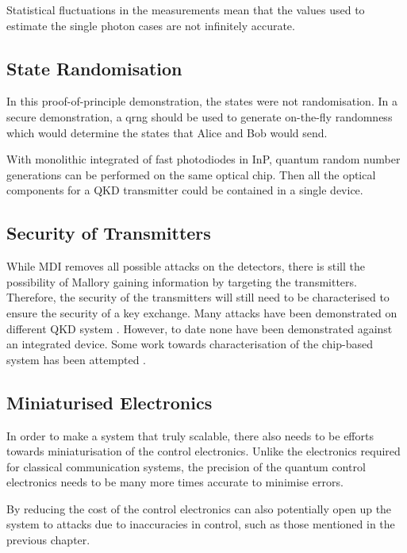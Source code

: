 Statistical fluctuations in the measurements mean that the values used to estimate the single photon cases are not infinitely accurate. 

\subsection{State Randomisation}

In this proof-of-principle demonstration, the states were not randomisation. In a secure demonstration, a \ac{qrng} should be used to generate on-the-fly randomness which would determine the states that Alice and Bob would send. 

With monolithic integrated of fast photodiodes in \ac{InP}, quantum random number generations can be performed on the same optical chip. Then all the optical components for a \ac{QKD} transmitter could be contained in a single device.

\subsection{Security of Transmitters}

While \ac{MDI} removes all possible attacks on the detectors, there is still the possibility of Mallory gaining information by targeting the transmitters. Therefore, the security of the transmitters will still need to be characterised to ensure the security of a key exchange. Many attacks have been demonstrated on different \ac{QKD} system \cite{makarov2019}. However, to date none have been demonstrated against an integrated device. Some work towards characterisation of the chip-based system has been attempted \cite{vaquero2018}.

\subsection{Miniaturised Electronics}

In order to make a system that truly scalable, there also needs to be efforts towards miniaturisation of the control electronics. Unlike the electronics required for classical communication systems, the precision of the quantum control electronics needs to be many more times accurate to minimise errors.

By reducing the cost of the control electronics can also potentially open up the system to attacks due to inaccuracies in control, such as those mentioned in the previous chapter. 

